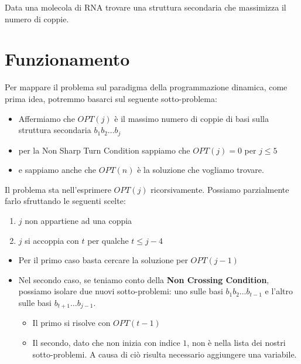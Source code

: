 Data una molecola di RNA trovare una struttura secondaria che massimizza
il numero di coppie.

\section{Funzionamento}

Per mappare il problema sul paradigma della programmazione dinamica,
come prima idea, potremmo basarci sul seguente sotto-problema:
\begin{myblockquote}
    \begin{itemize}
      \item Affermiamo che $OPT(j)$ è il massimo numero di coppie
            di basi sulla struttura secondaria $b_1 b_2 \ldots b_j$
      \item per la Non Sharp Turn Condition sappiamo che
            $OPT(j) = 0$ per $j \leq 5$
      \item e sappiamo anche che
            $OPT(n)$ è la soluzione che vogliamo trovare.
    \end{itemize}
\end{myblockquote}


Il problema sta nell'esprimere $OPT(j)$ ricorsivamente. Possiamo
parzialmente farlo sfruttando le seguenti scelte:
\begin{enumerate}
    \item $j$ non appartiene ad una coppia
    \item $j$ si accoppia con $t$ per qualche $t \leq j - 4$
\end{enumerate}
\begin{itemize}
  \item
        Per il primo caso basta cercare la soluzione per $OPT(j - 1)$
  \item
        Nel secondo caso, se teniamo conto della \textbf{Non Crossing
          Condition}, possiamo isolare due nuovi sotto-problemi: uno sulle basi
        $b_1 b_2 \ldots b_{t-1}$ e l'altro sulle basi
        $b_{t+1} \ldots b_{j-1}$.

        \begin{itemize}
          \item
                Il primo si risolve con $OPT(t-1)$
          \item
                Il secondo, dato che non inizia con indice $1$, non è nella lista
                dei nostri sotto-problemi. A causa di ciò risulta necessario
                aggiungere una variabile.
        \end{itemize}
\end{itemize}


